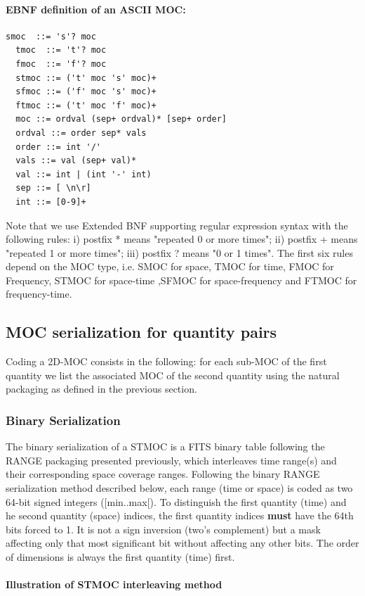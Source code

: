\documentclass[11pt,a4paper]{ivoa}
\begin{document}
\paragraph{EBNF definition of an ASCII MOC:}
\begin{lstlisting}[]
  smoc  ::= 's'? moc
  tmoc  ::= 't'? moc
  fmoc  ::= 'f'? moc
  stmoc ::= ('t' moc 's' moc)+
  sfmoc ::= ('f' moc 's' moc)+
  ftmoc ::= ('t' moc 'f' moc)+
  moc ::= ordval (sep+ ordval)* [sep+ order]
  ordval ::= order sep* vals
  order ::= int '/'
  vals ::= val (sep+ val)*
  val ::= int | (int '-' int)
  sep ::= [ \n\r]
  int ::= [0-9]+
\end{lstlisting}
Note that we use Extended BNF supporting regular expression
syntax with the following rules: i) postfix * means "repeated
0 or more times"; ii) postfix + means "repeated 1 or more
times"; iii) postfix ? means "0 or 1 times". The first six
rules depend on the MOC type, i.e. SMOC for space, TMOC for
time, FMOC for Frequency, STMOC for space-time ,SFMOC for
space-frequency and FTMOC for frequency-time.


\subsection{MOC serialization for quantity pairs}
\label{sec:2dmoce}

Coding a 2D-MOC consists in the following:
for each sub-MOC of the first quantity we list the associated MOC of the
second quantity using the natural packaging as defined in the previous section.

\subsubsection{Binary Serialization}
The binary serialization of a STMOC is a FITS binary table following
the RANGE packaging presented previously, which interleaves time range(s)
and their corresponding space coverage ranges. Following the binary
RANGE serialization method described below, each range (time or space)
is coded as two 64-bit signed integers ([min..max[). To distinguish
the first quantity (time) and he second quantity (space) indices,
the first quantity indices {\bf must} have the 64th bits forced
to 1. It is not a sign inversion (two's complement) but a mask affecting
only that most significant bit without affecting any other bits.
The order of dimensions is always the first quantity (time) first.

\paragraph{Illustration of STMOC interleaving method}
\end{document}
